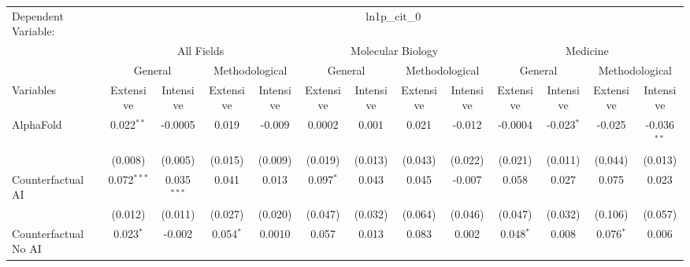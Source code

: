 \begingroup
\centering
\begin{tabular}{lcccccccccccc}
   \tabularnewline \midrule \midrule
   Dependent Variable: & \multicolumn{12}{c}{ln1p\_cit\_0}\\
 & \multicolumn{4}{c}{All Fields} & \multicolumn{4}{c}{Molecular Biology} & \multicolumn{4}{c}{Medicine} \\
\cmidrule(lr){2-5} \cmidrule(lr){6-9} \cmidrule(lr){10-13}
 & \multicolumn{2}{c}{General} & \multicolumn{2}{c}{Methodological} & \multicolumn{2}{c}{General} & \multicolumn{2}{c}{Methodological} & \multicolumn{2}{c}{General} & \multicolumn{2}{c}{Methodological} \\
\cmidrule(lr){2-3} \cmidrule(lr){4-5} \cmidrule(lr){6-7} \cmidrule(lr){8-9} \cmidrule(lr){10-11} \cmidrule(lr){12-13}
Variables & \multicolumn{1}{c}{Extensive} & \multicolumn{1}{c}{Intensive} & \multicolumn{1}{c}{Extensive} & \multicolumn{1}{c}{Intensive} & \multicolumn{1}{c}{Extensive} & \multicolumn{1}{c}{Intensive} & \multicolumn{1}{c}{Extensive} & \multicolumn{1}{c}{Intensive} & \multicolumn{1}{c}{Extensive} & \multicolumn{1}{c}{Intensive} & \multicolumn{1}{c}{Extensive} & \multicolumn{1}{c}{Intensive} \\
\cmidrule(lr){1-1}\cmidrule(lr){2-2} \cmidrule(lr){3-3} \cmidrule(lr){4-4} \cmidrule(lr){5-5} \cmidrule(lr){6-6} \cmidrule(lr){7-7} \cmidrule(lr){8-8} \cmidrule(lr){9-9} \cmidrule(lr){10-10} \cmidrule(lr){11-11} \cmidrule(lr){12-12} \cmidrule(lr){13-13}
   AlphaFold                                & 0.022$^{**}$  & -0.0005       & 0.019       & -0.009  & 0.0002       & 0.001          & 0.021   & -0.012         & -0.0004     & -0.023$^{*}$ & -0.025      & -0.036$^{**}$\\   
                                            & (0.008)       & (0.005)       & (0.015)     & (0.009) & (0.019)      & (0.013)        & (0.043) & (0.022)        & (0.021)     & (0.011)      & (0.044)     & (0.013)\\   
   Counterfactual AI                        & 0.072$^{***}$ & 0.035$^{***}$ & 0.041       & 0.013   & 0.097$^{*}$  & 0.043          & 0.045   & -0.007         & 0.058       & 0.027        & 0.075       & 0.023\\   
                                            & (0.012)       & (0.011)       & (0.027)     & (0.020) & (0.047)      & (0.032)        & (0.064) & (0.046)        & (0.047)     & (0.032)      & (0.106)     & (0.057)\\   
   Counterfactual No AI                     & 0.023$^{*}$   & -0.002        & 0.054$^{*}$ & 0.0010  & 0.057        & 0.013          & 0.083   & 0.002          & 0.048$^{*}$ & 0.008        & 0.076$^{*}$ & 0.006\\   

\end{tabular}
